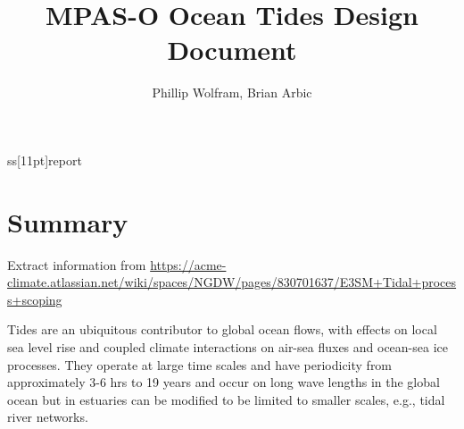 ss[11pt]{report}

\usepackage{epsf,amsmath,amsfonts}
\usepackage{graphicx}
\usepackage{booktabs}
\usepackage{color}
\usepackage{natbib}

\setlength{\textwidth}{6.5in}
\setlength{\oddsidemargin}{0in}
\setlength{\evensidemargin}{0in}
\setlength{\textheight}{8in}
\setlength{\topmargin}{0.5in}

\newcommand{\ds}{\displaystyle}
\setlength{\parskip}{1.2ex}
\setlength{\parindent}{0mm}
\newcommand{\bea}{\begin{eqnarray}}
\newcommand{\eea}{\end{eqnarray}}
\newcommand{\nn}{\nonumber}

\usepackage{minted}

\def\Mark#1{{\textcolor{red}{\bf \textit{By Mark: } #1}}} %
\def\Phillip#1{{\textcolor{cyan}{\bf \textit{By PhilW: } #1}}} %
\def\Steven#1{{\textcolor{blue}{\bf \textit{By Steven: } #1}}} %
\def\Luke#1{{\textcolor{green}{\bf \textit{By Luke: } #1}}} %
\def\Comment#1{{\textcolor{magenta}{\bf \textit{Comment: } #1}}} %


\title{MPAS-O Ocean Tides Design Document}
\author{Phillip Wolfram, Brian Arbic}


 
\maketitle
\tableofcontents


\chapter{Summary}

Extract information from \url{https://acme-climate.atlassian.net/wiki/spaces/NGDW/pages/830701637/E3SM+Tidal+process+scoping}

Tides are an ubiquitous contributor to global ocean flows, with effects on local sea level rise and coupled climate interactions on air-sea fluxes and ocean-sea ice processes.  They operate at large time scales and have periodicity from approximately 3-6 hrs to 19 years and occur on long wave lengths in the global ocean but in estuaries can be modified to be limited to smaller scales, e.g., tidal river networks. 

